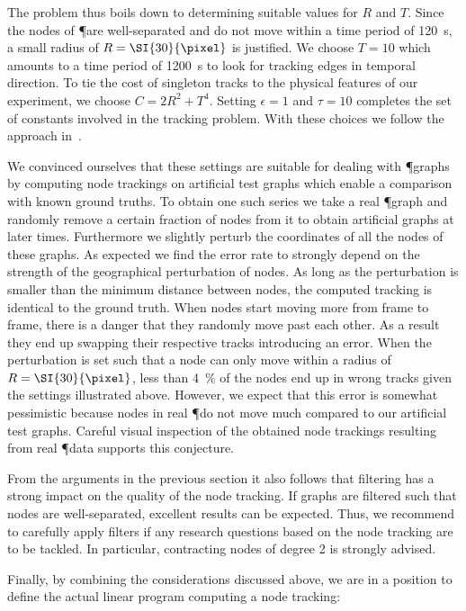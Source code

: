 		The problem thus boils down to determining suitable values for $R$ and $T$. Since the nodes of \P are well-separated and do not move within a time period of \SI{120}{\second}, a small radius of $R = \SI{30}{\pixel}$ is justified. We choose $T = 10$ which amounts to a time period of \SI{1200}{\second} to look for tracking edges in temporal direction. To tie the cost of singleton tracks to the physical features of our experiment, we choose $ C = 2 R^2 + T^4$. Setting $\epsilon =1$ and $\tau = 10$ completes the set of constants involved in the tracking problem. With these choices we follow the approach in~\cite{Karrenbauer2013}.

		We convinced ourselves that these settings are suitable for dealing with \P graphs by computing node trackings on artificial test graphs which enable a comparison with known ground truths. To obtain one such series we take a real \P graph and randomly remove a certain fraction of nodes from it to obtain artificial graphs at later times. Furthermore we slightly perturb the coordinates of all the nodes of these graphs. As expected we find the error rate to strongly depend on the strength of the geographical perturbation of nodes. As long as the perturbation is smaller than the minimum distance between nodes, the computed tracking is identical to the ground truth. When nodes start moving more from frame to frame, there is a danger that they randomly move past each other. As a result they end up swapping their respective tracks introducing an error. When the perturbation is set such that a node can only move within a radius of $R = \SI{30}{\pixel}$, less than \SI{4}{\percent} of the nodes end up in wrong tracks given the settings illustrated above. However, we expect that this error is somewhat pessimistic because nodes in real \P do not move much compared to our artificial test graphs. Careful visual inspection of the obtained node trackings resulting from real \P data supports this conjecture.

		From the arguments in the previous section it also follows that filtering has a strong impact on the quality of the node tracking. If graphs are filtered such that nodes are well-separated, excellent results can be expected. Thus, we recommend to carefully apply filters if any research questions based on the node tracking are to be tackled. In particular, contracting nodes of degree 2 is strongly advised.

		Finally, by combining the considerations discussed above, we are in a position to define the actual linear program computing a node tracking:

